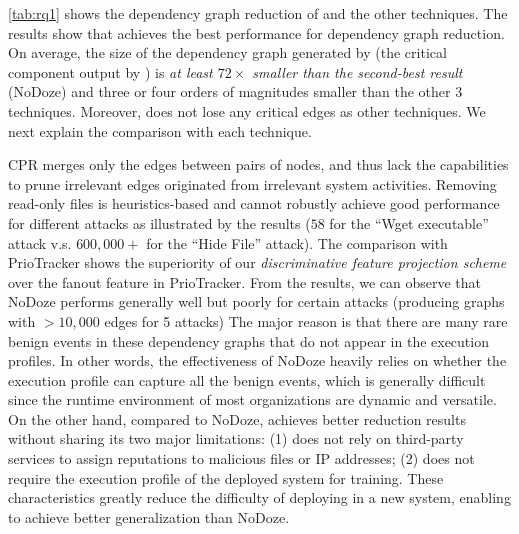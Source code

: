 \cref{tab:rq1} shows the dependency graph reduction of \tool and the other techniques.
The results show that \tool achieves the best performance for dependency graph reduction.
On average, the size of the dependency graph generated by \tool (\ie the critical component output by \tool) is \emph{at least $72\times$ smaller than the second-best result} (\ie NoDoze) and three or four orders of magnitudes smaller than the other 3 techniques. 
Moreover, \tool does not lose any critical edges as other techniques. 
We next explain the comparison with each technique.


CPR merges only the edges between pairs of nodes, and thus lack the capabilities to prune irrelevant edges originated from irrelevant system activities.
Removing read-only files is heuristics-based and cannot robustly achieve good performance for different attacks as illustrated by the results (\eg $58$ for the ``Wget executable'' attack v.s. $600,000+$ for the ``Hide File'' attack).
The comparison with PrioTracker shows the superiority of our \textit{discriminative feature projection scheme} over the fanout feature in PrioTracker.
From the results, we can observe that NoDoze  performs generally well but poorly for certain attacks (\eg producing graphs with $>10,000$ edges for 5 attacks)
The major reason is that there are many rare benign events in these dependency graphs that do not appear in the execution profiles.
In other words, the effectiveness of NoDoze heavily relies on whether the execution profile can capture all the benign events, which is generally difficult since the runtime environment of most organizations are dynamic and versatile.
%
On the other hand, compared to NoDoze, \tool achieves better reduction results without sharing its two major limitations:
(1) \tool does not rely on third-party services to assign reputations to malicious files or IP addresses;
(2) \tool does not require the execution profile of the deployed system for training. 
These characteristics greatly reduce the difficulty of deploying \tool in a new system, enabling \tool to achieve better generalization than NoDoze.

